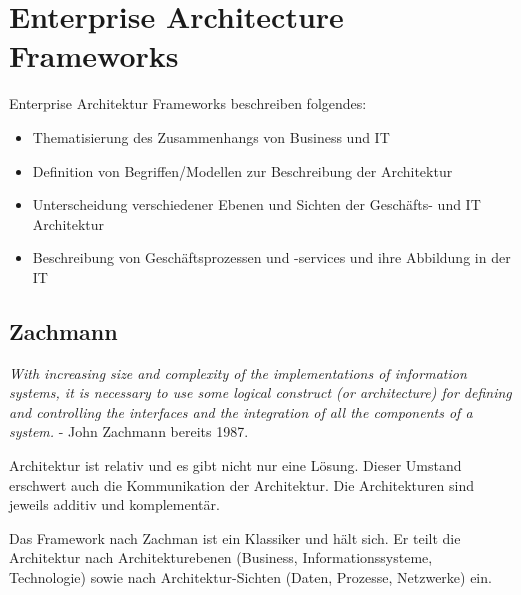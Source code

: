 \section{Enterprise Architecture Frameworks}

Enterprise Architektur Frameworks beschreiben folgendes:
\begin{itemize}
	\item Thematisierung des Zusammenhangs von Business und IT
	
	\item Definition von Begriffen/Modellen zur Beschreibung der Architektur
	
	\item Unterscheidung verschiedener Ebenen und Sichten der Geschäfts- und IT Architektur
	
	\item Beschreibung von Geschäftsprozessen und -services und ihre Abbildung in der IT
\end{itemize}

\subsection{Zachmann}

\textit{With increasing size and complexity of the implementations of information systems, it is necessary to use some logical construct (or architecture) for defining and controlling the interfaces and the integration of all the components of a system.} - John Zachmann bereits 1987.

Architektur ist relativ und es gibt nicht nur eine Lösung. Dieser Umstand erschwert auch die Kommunikation der Architektur. Die Architekturen sind jeweils additiv und komplementär.

Das Framework nach Zachman ist ein Klassiker und hält sich. Er teilt die Architektur nach Architekturebenen (Business, Informationssysteme, Technologie) sowie nach Architektur-Sichten (Daten, Prozesse, Netzwerke) ein.

